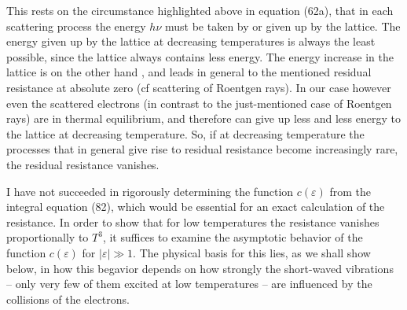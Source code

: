 \begin{paper}{1}
This rests on the circumstance highlighted above in equation (62a), that in each scattering process the energy $h\nu$ must be taken by or given up by the lattice. The energy given up by the lattice at decreasing temperatures is always the least possible, since the lattice always contains less energy. The energy increase in the lattice is on the other hand , and leads in general to the mentioned residual resistance at absolute zero (cf scattering of Roentgen rays). In our case however even the scattered electrons (in contrast to the just-mentioned case of Roentgen rays) are in thermal equilibrium, and therefore can give up less and less energy to the lattice at decreasing temperature. So, if at decreasing temperature the processes that in general give rise to residual resistance become increasingly rare, the residual resistance vanishes.

I have not succeeded in rigorously determining the function $c(\varepsilon)$ from the integral equation (82), which would be essential for an exact calculation of the resistance. In order to show that for low temperatures the resistance vanishes proportionally to $T^3$, it suffices to examine the asymptotic behavior of the function $c(\varepsilon)$ for $|\varepsilon|\gg 1$. The physical basis for this lies, as we shall show below, in how this begavior depends on how strongly the short-waved vibrations -- only very few of them excited at low temperatures -- are influenced by the collisions of the electrons.


\end{paper}
